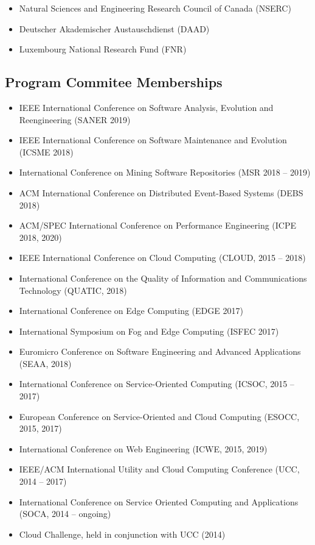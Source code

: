 \documentclass[paper=letter,fontsize=11pt]{scrartcl} %
\begin{document}
\begin{itemize}
  \item Natural Sciences and Engineering Research Council of Canada (NSERC)
	\item Deutscher Akademischer Austauschdienst (DAAD)
	\item Luxembourg National Research Fund (FNR)
\end{itemize}

\subsection*{Program Commitee Memberships}
\begin{itemize}
	\item IEEE International Conference on Software Analysis, Evolution and Reengineering (SANER 2019)
	\item IEEE International Conference on Software Maintenance and Evolution (ICSME 2018)
	\item International Conference on Mining Software Repositories (MSR 2018 -- 2019)
  \item ACM International Conference on Distributed Event-Based Systems (DEBS 2018)
	\item ACM/SPEC International Conference on Performance Engineering (ICPE 2018, 2020)
	\item IEEE International Conference on Cloud Computing (CLOUD, 2015 -- 2018)
	\item International Conference on the Quality of Information and Communications Technology (QUATIC, 2018)
	\item International Conference on Edge Computing (EDGE 2017)
  \item International Symposium on Fog and Edge Computing (ISFEC 2017)
	\item Euromicro Conference on Software Engineering and Advanced Applications (SEAA, 2018)
	\item International Conference on Service-Oriented Computing (ICSOC, 2015 -- 2017)
  \item European Conference on Service-Oriented and Cloud Computing (ESOCC, 2015, 2017)
  \item International Conference on Web Engineering (ICWE, 2015, 2019)
  \item IEEE/ACM International Utility and Cloud Computing Conference (UCC, 2014 -- 2017)
  \item International Conference on Service Oriented Computing and Applications (SOCA, 2014 -- ongoing)
	\item Cloud Challenge, held in conjunction with UCC (2014)

\end{itemize}
\end{document}
